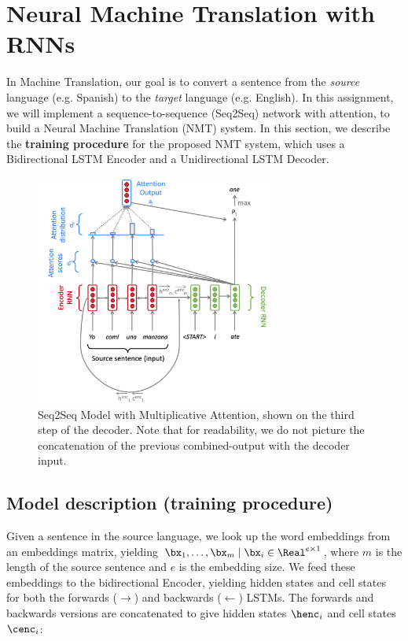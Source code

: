 \section{Neural Machine Translation with RNNs}
In Machine Translation, our goal is to convert a sentence from the \textit{source} language (e.g. Spanish) to the \textit{target} language (e.g. English). In this assignment, we will implement a sequence-to-sequence (Seq2Seq) network with attention, to build a Neural Machine Translation (NMT) system. In this section, we describe the \textbf{training procedure} for the proposed NMT system, which uses a Bidirectional LSTM Encoder and a Unidirectional LSTM Decoder.
\newline

\begin{figure}[h]
    \begin{center}
        \captionsetup{width=0.8\textwidth}
        \includegraphics[width=0.7\textwidth]{images/nmt.png}
        \caption{Seq2Seq Model with Multiplicative Attention, shown on the third step of the decoder. Note that for readability, we do not picture the concatenation of the previous combined-output with the decoder input.}
        \label{nmt-figure}
    \end{center}
\end{figure}

\subsection*{Model description (training procedure)}
Given a sentence in the source language, we look up the word embeddings from an embeddings matrix, yielding $\bx_1, \dots, \bx_m \mid \bx_i \in \Real^{e \times 1}$, where $m$ is the length of the source sentence and $e$ is the embedding size. We feed these embeddings to the bidirectional Encoder, yielding hidden states and cell states for both the forwards ($\rightarrow$) and backwards ($\leftarrow$) LSTMs. The forwards and backwards versions are concatenated to give hidden states $\henc_i$ and cell states $\cenc_i$:
 
